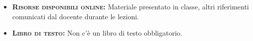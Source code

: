 \documentclass[11pt, a4paper]{article}
\begin{document}
\begin{itemize}[itemsep=4pt,parsep=0pt,topsep=1pt,partopsep=1pt]
	\item[\color{darkblue}\faNewspaper] \textbf{\textsc{Risorse disponibili online:}}
	Materiale presentato in classe, altri riferimenti comunicati dal docente durante le lezioni.  
		
	\item[\color{darkblue}\faBook] \textbf{\textsc{Libro di testo:}} Non c'\`{e} un libro di testo obbligatorio. %
\end{itemize}

\end{document}
